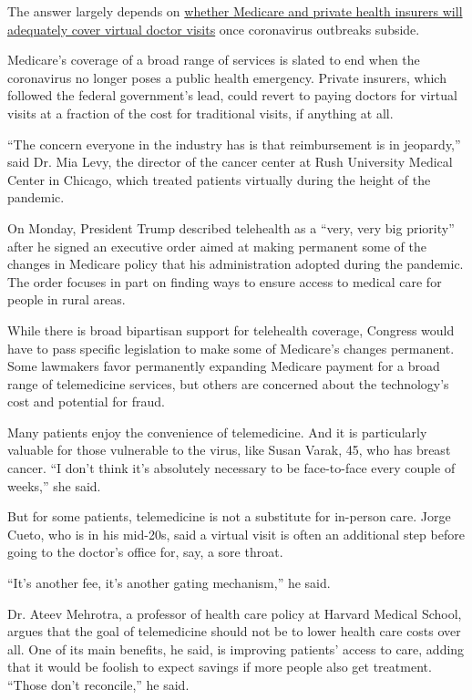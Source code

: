 The answer largely depends on
\href{https://www.nytimes3xbfgragh.onion/2020/08/03/health/covid-telemedicine-congress.html}{whether
Medicare and private health insurers will adequately cover virtual
doctor visits} once coronavirus outbreaks subside.

Medicare's coverage of a broad range of services is slated to end when
the coronavirus no longer poses a public health emergency. Private
insurers, which followed the federal government's lead, could revert to
paying doctors for virtual visits at a fraction of the cost for
traditional visits, if anything at all.

``The concern everyone in the industry has is that reimbursement is in
jeopardy,'' said Dr. Mia Levy, the director of the cancer center at Rush
University Medical Center in Chicago, which treated patients virtually
during the height of the pandemic.

On Monday, President Trump described telehealth as a ``very, very big
priority'' after he signed an executive order aimed at making permanent
some of the changes in Medicare policy that his administration adopted
during the pandemic. The order focuses in part on finding ways to ensure
access to medical care for people in rural areas.

While there is broad bipartisan support for telehealth coverage,
Congress would have to pass specific legislation to make some of
Medicare's changes permanent. Some lawmakers favor permanently expanding
Medicare payment for a broad range of telemedicine services, but others
are concerned about the technology's cost and potential for fraud.

Many patients enjoy the convenience of telemedicine. And it is
particularly valuable for those vulnerable to the virus, like Susan
Varak, 45, who has breast cancer. ``I don't think it's absolutely
necessary to be face-to-face every couple of weeks,'' she said.

But for some patients, telemedicine is not a substitute for in-person
care. Jorge Cueto, who is in his mid-20s, said a virtual visit is often
an additional step before going to the doctor's office for, say, a sore
throat.

``It's another fee, it's another gating mechanism,'' he said.

Dr. Ateev Mehrotra, a professor of health care policy at Harvard Medical
School, argues that the goal of telemedicine should not be to lower
health care costs over all. One of its main benefits, he said, is
improving patients' access to care, adding that it would be foolish to
expect savings if more people also get treatment. ``Those don't
reconcile,'' he said.

